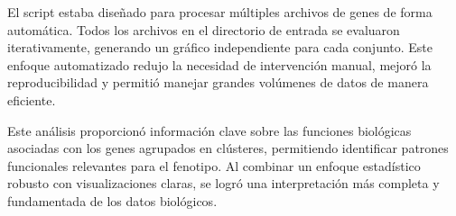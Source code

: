 El script estaba diseñado para procesar múltiples archivos de genes de forma automática. Todos los archivos en el directorio de entrada se evaluaron iterativamente, generando un gráfico independiente para cada conjunto. Este enfoque automatizado redujo la necesidad de intervención manual, mejoró la reproducibilidad y permitió manejar grandes volúmenes de datos de manera eficiente.

Este análisis proporcionó información clave sobre las funciones biológicas asociadas con los genes agrupados en clústeres, permitiendo identificar patrones funcionales relevantes para el fenotipo. Al combinar un enfoque estadístico robusto con visualizaciones claras, se logró una interpretación más completa y fundamentada de los datos biológicos.




